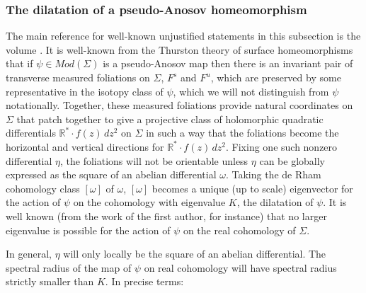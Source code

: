 \documentclass[11pt]{amsart}
\numberwithin{thm}{section}
\begin{document}
\subsubsection{The dilatation of a pseudo-Anosov homeomorphism}
The main reference for well-known unjustified statements in this subsection is the volume \cite{FLP}.  It is well-known from the Thurston theory of surface homeomorphisms that if $\psi\in Mod(\Sigma)$ is a pseudo-Anosov map then there is an invariant pair of transverse measured foliations on $\Sigma$, $F^s$ and $F^u$, which are preserved by some representative in the isotopy class of $\psi$, which we will not distinguish from $\psi$ notationally.  Together, these measured foliations provide natural coordinates on $\Sigma$ that patch together to give a projective class of holomorphic quadratic differentials ${\mathbb{R}}^*\cdot f(z)\, dz^2$ on $\Sigma$ in such a way that the foliations become the horizontal and vertical directions for ${\mathbb{R}}^*\cdot f(z)\, dz^2$.  Fixing one such nonzero differential $\eta$, the foliations will not be orientable unless $\eta$ can be globally expressed as the square of an abelian differential $\omega$.  Taking the de Rham cohomology class $[\omega]$ of $\omega$, $[\omega]$ becomes a unique (up to scale) eigenvector for the action of $\psi$ on the cohomology with eigenvalue $K$, the dilatation of $\psi$.  It is well known (from the work of the first author, for instance) that no larger eigenvalue is possible for the action of $\psi$ on the real cohomology of $\Sigma$.

In general, $\eta$ will only locally be the square of an abelian differential.  The spectral radius of the map of $\psi$ on real cohomology will have spectral radius strictly smaller than $K$.  In precise terms:
\end{document}
